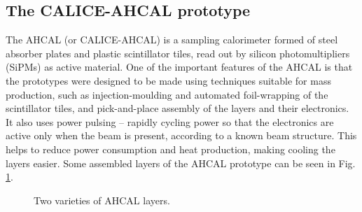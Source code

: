 \subsection*{The CALICE-AHCAL prototype} %
The \acrlong{AHCAL} (or \acrshort{CALICE}-\acrshort{AHCAL}) is a sampling calorimeter formed of steel absorber plates and plastic scintillator tiles, read out by silicon photomultipliers (\acrshort{SiPM}s) as active material\cite{calice-ahcal-dossier-update}. One of the important features of the \acrshort{AHCAL} is that the prototypes were designed to be made using techniques suitable for mass production, such as injection-moulding and automated foil-wrapping of the scintillator tiles, and pick-and-place assembly of the layers and their electronics. It also uses power pulsing -- rapidly cycling power so that the electronics are active only when the beam is present, according to a known beam structure. This helps to reduce power consumption and heat production, making cooling the layers easier. Some assembled layers of the \acrshort{AHCAL} prototype can be seen in Fig. \ref{figure:aida/may2016/layers}.

\begin{figure}[h]%
	\centering
    \qquad
    \caption{Two varieties of \acrshort{AHCAL} layers.}%
    \label{figure:aida/may2016/layers}%
\end{figure}

